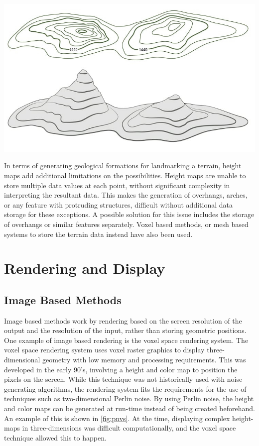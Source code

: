\documentclass[10pt]{report}
\begin{document}
		\begin{minipage}{\textwidth}
			\centering
			\includegraphics[scale=.5]{top-map}
			\label{fig:top-map}
		\end{minipage} 
	
		In terms of generating geological formations for landmarking a terrain, height maps add additional limitations on the possibilities. Height maps are unable to store multiple data values at each point, without significant complexity in interpreting the resultant data. This makes the generation of overhangs, arches, or any feature with protruding structures, difficult without additional data storage for these exceptions. A possible solution for this issue includes the storage of overhangs or similar features separately. Voxel based methods, or mesh based systems to store the terrain data instead have also been used.  
		
	\vspace{10pt}
	\let\clearpage\relax
	\chapter{Rendering and Display}
	
		\section{Image Based Methods}
		
		Image based methods work by rendering based on the screen resolution of the output and the resolution of the input, rather than storing geometric positions. One example of image based rendering is the voxel space rendering system. The voxel space rendering system uses voxel raster graphics to display three-dimensional geometry with low memory and processing requirements. This was developed in the early 90's, involving a height and color map to position the pixels on the screen. While this technique was not historically used with noise generating algorithms, the rendering system fits the requirements for the use of techniques such as two-dimensional Perlin noise. By using Perlin noise, the height and color maps can be generated at run-time instead of being created beforehand. An example of this is shown in \autoref{fig:pnvs}. At the time, displaying complex height-maps in three-dimensions was difficult computationally, and the voxel space technique allowed this to happen.
		
\end{document}
